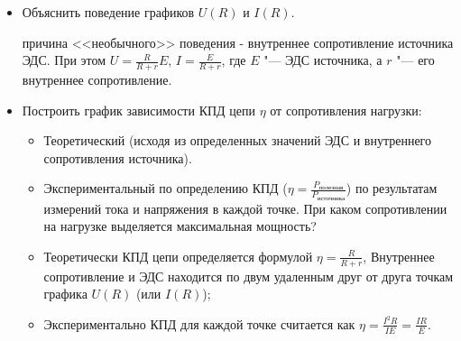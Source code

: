 \AdditionalQuestions
\begin{itemize}
    \item Объяснить поведение графиков \(U(R)\) и \(I(R)\).\par
    \Answer причина <<необычного>> поведения - внутреннее сопротивление источника ЭДС. При этом \(U=\frac{R}{R+r}E\), \(I=\frac{E}{R+r}\), где \(E\) "--- ЭДС источника, а \(r\) "--- его внутреннее сопротивление.
    \item Построить график зависимости КПД цепи \(\eta\) от сопротивления нагрузки:
    \begin{itemize} 
        \item Теоретический (исходя из определенных значений ЭДС и внутреннего сопротивления источника).
        \item Экспериментальный по определению КПД (\(\eta=\frac{P_\text{полезная}}{P_\text{источника}}\)) по результатам измерений тока и напряжения в каждой точке. При каком сопротивлении на нагрузке выделяется максимальная мощность?
    \end{itemize}
    \Answer \begin{itemize}
        \item Теоретически КПД цепи определяется формулой \(\eta=\frac{R}{R+r}\), Внутреннее сопротивление и ЭДС находится по двум удаленным друг от друга точкам графика \(U(R)\) (или \(I(R)\));
        \item Экспериментально КПД для каждой точке считается как \(\eta=\frac{I^2 R}{IE}=\frac{IR}{E}\).
    \end{itemize}
\end{itemize}
